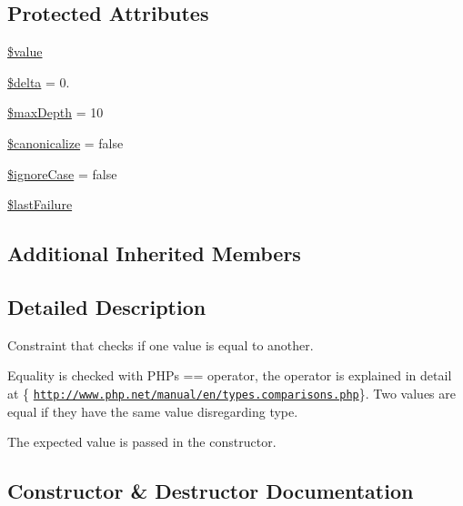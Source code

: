 \subsection*{Protected Attributes}
\begin{DoxyCompactItemize}
\item 
\mbox{\hyperlink{class_p_h_p_unit___framework___constraint___is_equal_a0f298096f322952a72a50f98a74c7b60}{\$value}}
\item 
\mbox{\hyperlink{class_p_h_p_unit___framework___constraint___is_equal_a4f859c2cb6894b390e922966d2eb7554}{\$delta}} = 0.
\item 
\mbox{\hyperlink{class_p_h_p_unit___framework___constraint___is_equal_a9f16d8a89cf22fc718af7b8698aa5c2d}{\$max\+Depth}} = 10
\item 
\mbox{\hyperlink{class_p_h_p_unit___framework___constraint___is_equal_ad4fde04bc64f6c7a0fb80f24a833332f}{\$canonicalize}} = false
\item 
\mbox{\hyperlink{class_p_h_p_unit___framework___constraint___is_equal_a76b26ca72faf8384c4f8e767390feee9}{\$ignore\+Case}} = false
\item 
\mbox{\hyperlink{class_p_h_p_unit___framework___constraint___is_equal_a72db544bccfecceebee794a02787193d}{\$last\+Failure}}
\end{DoxyCompactItemize}
\subsection*{Additional Inherited Members}


\subsection{Detailed Description}
Constraint that checks if one value is equal to another.

Equality is checked with P\+HP\textquotesingle{}s == operator, the operator is explained in detail at \{ \href{http://www.php.net/manual/en/types.comparisons.php}{\tt http\+://www.\+php.\+net/manual/en/types.\+comparisons.\+php}\}. Two values are equal if they have the same value disregarding type.

The expected value is passed in the constructor. 

\subsection{Constructor \& Destructor Documentation}
\mbox{\label{class_p_h_p_unit___framework___constraint___is_equal_a802b4f2de05667a7d6a8c8973944dc35}} 
